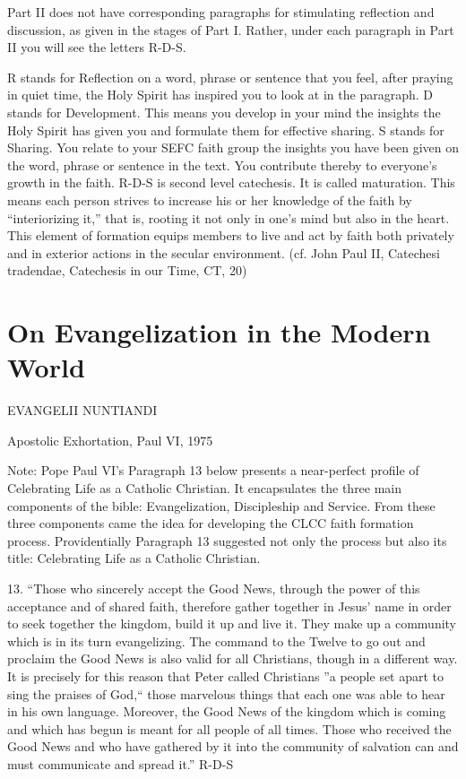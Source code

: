 \documentclass[oneside]{book}
\begin{document}
Part II does not have corresponding paragraphs for stimulating reflection and
discussion, as given in the stages of Part I. Rather, under each paragraph in
Part II you will see the letters R-D-S.

R stands for Reflection on a word, phrase or sentence that you feel, after
praying in quiet time, the Holy Spirit has inspired you to look at in the
paragraph. D stands for Development. This means you develop in your mind the
insights the Holy Spirit has given you and formulate them for effective
sharing. S stands for Sharing. You relate to your SEFC faith group the insights
you have been given on the word, phrase or sentence in the text. You contribute
thereby to everyone's growth in the faith. R-D-S is second level catechesis. It
is called maturation. This means each person strives to increase his or her
knowledge of the faith by ``interiorizing it,'' that is, rooting it not only in
one's mind but also in the heart. This element of formation equips members to
live and act by faith both privately and in exterior actions in the secular
environment. (cf. John Paul II, Catechesi tradendae, Catechesis in our Time, CT,
20)


\chapter{On Evangelization in the Modern World}

EVANGELII NUNTIANDI

Apostolic Exhortation, Paul VI, 1975

Note: Pope Paul VI's Paragraph 13 below presents a near-perfect profile of
Celebrating Life as a Catholic Christian. It encapsulates the three main
components of the bible: Evangelization, Discipleship and Service. From these
three components came the idea for developing the CLCC faith formation
process. Providentially Paragraph 13 suggested not only the process but also its
title: Celebrating Life as a Catholic Christian.

13. ``Those who sincerely accept the Good News, through the power of this
acceptance and of shared faith, therefore gather together in Jesus' name in
order to seek together the kingdom, build it up and live it. They make up a
community which is in its turn evangelizing. The command to the Twelve to go out
and proclaim the Good News is also valid for all Christians, though in a
different way. It is precisely for this reason that Peter called Christians ''a
people set apart to sing the praises of God,`` those marvelous things that each
one was able to hear in his own language. Moreover, the Good News of the kingdom
which is coming and which has begun is meant for all people of all times. Those
who received the Good News and who have gathered by it into the community of
salvation can and must communicate and spread it.''
R-D-S
\end{document}

